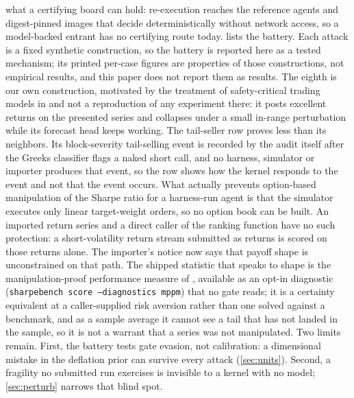 what a certifying board can hold: re-execution reaches the reference agents and digest-pinned images that decide deterministically without network access, so a model-backed entrant has no certifying route today.  lists the battery. Each attack is a fixed synthetic construction, so the battery is reported here as a tested mechanism; its printed per-case figures are properties of those constructions, not empirical results, and this paper does not report them as results. The eighth is our own construction, motivated by the treatment of safety-critical trading models in \citet{deza2021interpretability} and not a reproduction of any experiment there: it posts excellent returns on the presented series and collapses under a small in-range perturbation while its forecast head keeps working. The tail-seller row proves less than its neighbors. Its block-severity tail-selling event is recorded by the audit itself after the Greeks classifier flags a naked short call, and no harness, simulator or importer produces that event, so the row shows how the kernel responds to the event and not that the event occurs. What actually prevents option-based manipulation of the Sharpe ratio \citep{goetzmann2007manipulation} for a harness-run agent is that the simulator executes only linear target-weight orders, so no option book can be built. An imported return series and a direct caller of the ranking function have no such protection: a short-volatility return stream submitted as returns is scored on those returns alone. The importer's notice now says that payoff shape is unconstrained on that path. The shipped statistic that speaks to shape is the manipulation-proof performance measure of \citet{goetzmann2007manipulation}, available as an opt-in diagnostic (\texttt{sharpebench score --diagnostics mppm}) that no gate reads; it is a certainty equivalent at a caller-supplied risk aversion rather than one solved against a benchmark, and as a sample average it cannot see a tail that has not landed in the sample, so it is not a warrant that a series was not manipulated. Two limits remain. First, the battery tests gate evasion, not calibration: a dimensional mistake in the deflation prior can survive every attack (\cref{sec:units}). Second, a fragility no submitted run exercises is invisible to a kernel with no model; \cref{sec:perturb} narrows that blind spot.



